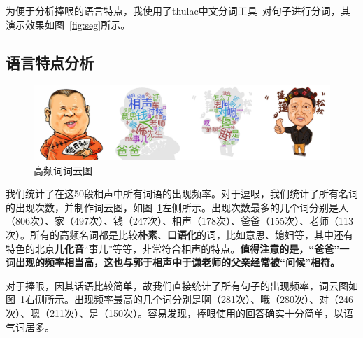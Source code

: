 \documentclass[12pt]{article} %
\begin{document}
\begin{sloppypar}
为便于分析捧哏的语言特点，我使用了thulac中文分词工具~\cite{thulac}对句子进行分词，其演示效果如图~\ref{fig:seg}所示。

\subsection{语言特点分析}


\begin{figure}[h]
	\centering
	\includegraphics[width=\linewidth]{figure/gy_wc.png}
	\caption{高频词词云图\protect\footnotemark}
	\label{fig:wordcloud}
\end{figure}

我们统计了在这50段相声中所有词语的出现频率。对于逗哏，我们统计了所有名词的出现次数，并制作词云图，如图~\ref{fig:wordcloud}左侧所示。出现次数最多的几个词分别是人（806次）、家（497次）、钱（247次）、相声（178次）、爸爸（155次）、老师（113次）。所有的高频名词都是比较{\bf 朴素}、{\bf 口语化}的词，比如意思、媳妇等，其中还有特色的北京{\bf 儿化音}“事儿”等等，非常符合相声的特点。{\bf 值得注意的是，“爸爸”一词出现的频率相当高，这也与郭于相声中于谦老师的父亲经常被“问候”相符。}

对于捧哏，因其话语比较简单，故我们直接统计了所有句子的出现频率，词云图如图~\ref{fig:wordcloud}右侧所示。出现频率最高的几个词分别是啊（281次）、哦（280次）、对（246次）、嗯（211次）、是（150次）。容易发现，捧哏使用的回答确实十分简单，以语气词居多。


\end{sloppypar}
\end{document}
